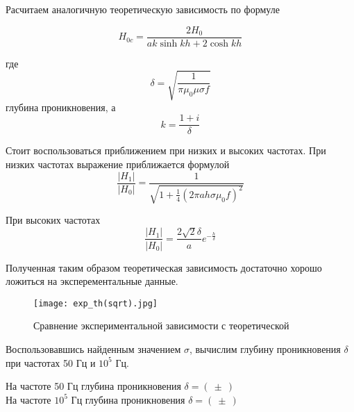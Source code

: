     Расчитаем аналогичную теоретическую зависимость по формуле

    \begin{equation}
        H_{0c} = \frac{2 H_0}{a k \sinh{k h} + 2 \cosh{k h}}
    \end{equation}

    где
    \begin{equation}
        \delta = \sqrt{\frac{1}{\pi \mu_0 \mu \sigma f}}
    \end{equation}
    глубина проникновения, а
    \begin{equation}
       k = \frac{1 + i}{\delta} 
    \end{equation}

    Стоит воспользоваться приближением при низких и высоких частотах. 
    При низких частотах выражение приближается формулой 
    \begin{equation}
        \frac{|H_1|}{|H_0|} = \frac{1}{\sqrt{1 + \frac{1}{4} (2 \pi a h \sigma \mu_0 f)^2}}
    \end{equation}

    При высоких частотах 
    \begin{equation}
        \frac{|H_1|}{|H_0|} = \frac{2 \sqrt{2} \delta}{a} e^{-\frac{h}{\delta}}
    \end{equation}

    Полученная таким образом теоретическая зависимость достаточно хорошо ложиться на эксперементальные данные.

    \begin{figure}
        \centering
        \texttt{[image: exp\_th(sqrt).jpg]}
        \caption{Сравнение экспериментальной зависимости с теоретической}
        \label{exp_th(sqrt)}
    \end{figure}

    Воспользовавшись найденным значением $\sigma$, вычислим глубину проникновения $\delta$ при частотах 50 Гц и $10^5$ Гц.

    \begin{center}
        На частоте 50 Гц глубина проникновения $\delta = ( ~ \pm ~ )$ \\
        На частоте $10^5$ Гц глубина проникновения $\delta = ( ~ \pm ~ )$
    \end{center}
    
